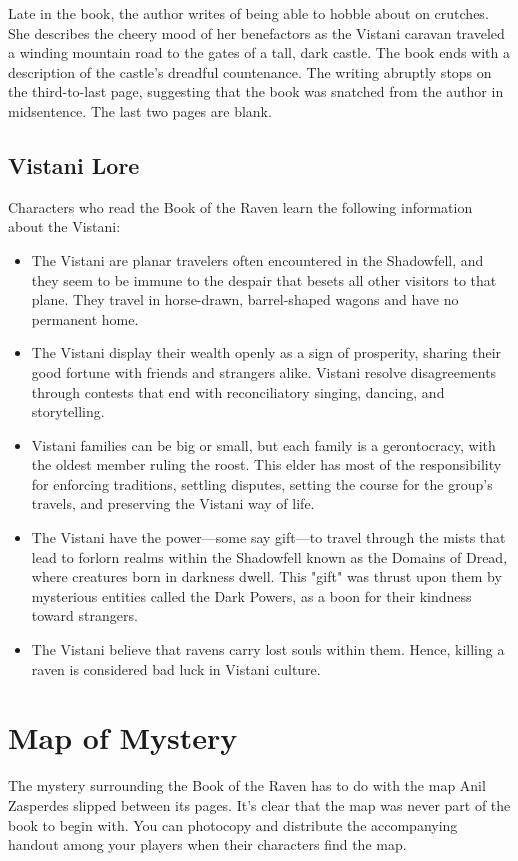 \documentclass[10pt,a4paper,twoside,bg=print,twocolumn,openany,nodeprecatedcode]{dndbook}
\begin{document}
Late in the book, the author writes of being able to hobble about on crutches. She describes the cheery mood of her benefactors as the Vistani caravan traveled a winding mountain road to the gates of a tall, dark castle. The book ends with a description of the castle's dreadful countenance. The writing abruptly stops on the third-to-last page, suggesting that the book was snatched from the author in midsentence. The last two pages are blank.

\subsection{Vistani Lore}
Characters who read the Book of the Raven learn the following information about the Vistani:


\begin{itemize}
\item The Vistani are planar travelers often encountered in the Shadowfell, and they seem to be immune to the despair that besets all other visitors to that plane. They travel in horse-drawn, barrel-shaped wagons and have no permanent home.
\item The Vistani display their wealth openly as a sign of prosperity, sharing their good fortune with friends and strangers alike. Vistani resolve disagreements through contests that end with reconciliatory singing, dancing, and storytelling.
\item Vistani families can be big or small, but each family is a gerontocracy, with the oldest member ruling the roost. This elder has most of the responsibility for enforcing traditions, settling disputes, setting the course for the group's travels, and preserving the Vistani way of life.
\item The Vistani have the power—some say gift—to travel through the mists that lead to forlorn realms within the Shadowfell known as the Domains of Dread, where creatures born in darkness dwell. This "gift" was thrust upon them by mysterious entities called the Dark Powers, as a boon for their kindness toward strangers.
\item The Vistani believe that ravens carry lost souls within them. Hence, killing a raven is considered bad luck in Vistani culture.
\end{itemize}

\section{Map of Mystery}
The mystery surrounding the Book of the Raven has to do with the map Anil Zasperdes slipped between its pages. It's clear that the map was never part of the book to begin with. You can photocopy and distribute the accompanying handout among your players when their characters find the map.
\end{document}
